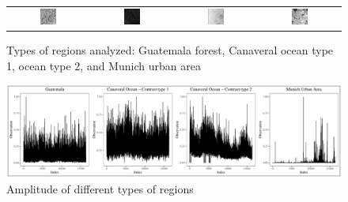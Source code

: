 \documentclass[journal]{IEEEtran}
\begin{document}
\begin{figure}[hbt]
	\begin{tabular}{cccc}
		\includegraphics[width=0.22\textwidth]{Figures/guatemalaflorest.pdf} &   \includegraphics[width=0.22\textwidth]{Figures/Cape1.pdf} &
		\includegraphics[width=0.22\textwidth]{Figures/Cape2.pdf} &  \includegraphics[width=0.22\textwidth]{Figures/munichUrban.pdf} \\
	\end{tabular}
	\caption{Types of regions analyzed: Guatemala forest, Canaveral ocean type 1,
		ocean type 2, and Munich urban area}
	\label{fig:samples}
\end{figure}

\begin{figure}[hbt]
	\includegraphics[width=2\columnwidth]{Figures/SAR_TS.pdf}
	\caption{Amplitude of different types of regions}
	\label{fig:timeSeries}
\end{figure}
\end{document}
